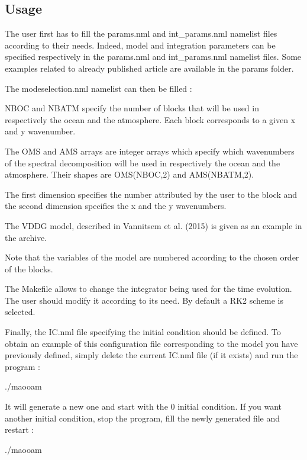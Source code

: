 \subsection*{Usage}

The user first has to fill the params.\+nml and int\+\_\+params.\+nml namelist files according to their needs. Indeed, model and integration parameters can be specified respectively in the params.\+nml and int\+\_\+params.\+nml namelist files. Some examples related to already published article are available in the params folder.

The modeselection.\+nml namelist can then be filled \+:
\begin{DoxyItemize}
\item N\+B\+OC and N\+B\+A\+TM specify the number of blocks that will be used in respectively the ocean and the atmosphere. Each block corresponds to a given x and y wavenumber.
\item The O\+MS and A\+MS arrays are integer arrays which specify which wavenumbers of the spectral decomposition will be used in respectively the ocean and the atmosphere. Their shapes are O\+M\+S(\+N\+B\+O\+C,2) and A\+M\+S(\+N\+B\+A\+T\+M,2).
\item The first dimension specifies the number attributed by the user to the block and the second dimension specifies the x and the y wavenumbers.
\item The V\+D\+DG model, described in Vannitsem et al. (2015) is given as an example in the archive.
\item Note that the variables of the model are numbered according to the chosen order of the blocks.
\end{DoxyItemize}

The Makefile allows to change the integrator being used for the time evolution. The user should modify it according to its need. By default a R\+K2 scheme is selected.

Finally, the I\+C.\+nml file specifying the initial condition should be defined. To obtain an example of this configuration file corresponding to the model you have previously defined, simply delete the current I\+C.\+nml file (if it exists) and run the program \+: \begin{DoxyVerb}./maooam
\end{DoxyVerb}


It will generate a new one and start with the 0 initial condition. If you want another initial condition, stop the program, fill the newly generated file and restart \+: \begin{DoxyVerb}./maooam
\end{DoxyVerb}


